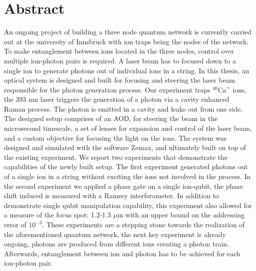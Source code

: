 \documentclass[english, a4paper, 12pt, twoside]{book}
\numberwithin{equation}{section} %
\begin{document}
{

}
\restoregeometry %

\thispagestyle{plain} %
\clearpage\mbox{}\clearpage %

\newpage

\section*{Abstract}
An ongoing project of building a three node quantum network is currently carried out at the university of Innsbruck with ion traps being the nodes of the network. To make entanglement between ions located in the three nodes, control over multiple ion-photon pairs is required. A laser beam has to focused down to a single ion to generate photons out of individual ions in a string. In this thesis, an optical system is designed and built for focusing and steering the laser beam responsible for the photon generation process. Our experiment traps $^{40}\text{Ca}^+$ ions, the 393 nm laser triggers the generation of a photon via a cavity enhanced Raman process. The photon is emitted in a cavity and leaks out from one side.
The designed setup comprises of an AOD, for steering the beam in the microsecond timescale, a set of lenses for expansion and control of the laser beam, and a custom objective for focusing the light on the ions. The system was designed and simulated with the software Zemax, and ultimately built on top of the existing experiment. We report two experiments that demonstrate the capabilities of the newly built setup. The first experiment generated photons out of a single ion in a string without exciting the ions not involved in the process. In the second experiment we applied a phase gate on a single ion-qubit, the phase shift induced is measured with a Ramsey interferometer. In addition to demonstrate single qubit manipulation capability, this experiment also allowed for a measure of the focus spot: 1.2-1.3 $\mu$m with an upper bound on the addressing error of $10^{-3}$. These experiments are a stepping stone towards the realization of the aforementioned quantum network, the next key experiment is already ongoing, photons are produced from different ions creating a photon train. Afterwards, entanglement between ion and photon has to be achieved for each ion-photon pair.
\newpage
\end{document}
